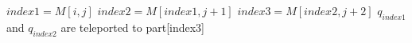 \begin{algorithm}
{
\begin{algorithmic}[2]


\State $index1=M[i,j]$ 
\State $index2=M[index1,j+1]$ 
\State $index3=M[index2,j+2]$   
             \State $q_{index1}$ and $q_{index2}$ are teleported to part[index3]
     
         \EndIf
 \EndIf

\end{algorithmic}
}
\end{algorithm}